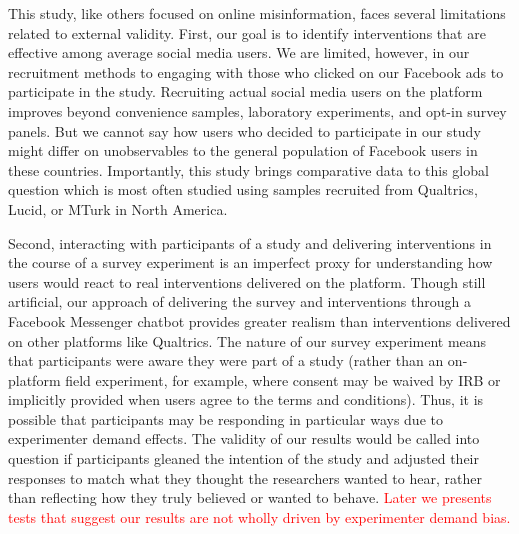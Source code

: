\documentclass[letterpaper, 12pt, parskip=full,DIV=10]{scrartcl}
\begin{document}


This study, like others focused on online misinformation, faces several limitations related to external validity. First, our goal is to identify interventions that are effective among average social media users. We are limited, however, in our recruitment methods to engaging with those who clicked on our Facebook ads to participate in the study.  Recruiting actual social media users on the platform improves beyond convenience samples, laboratory experiments, and opt-in survey panels.  But we cannot say how users who decided to participate in our study might differ on unobservables to the general population of Facebook users in these countries. Importantly, this study brings comparative data to this global question which is most often studied using samples recruited from Qualtrics, Lucid, or MTurk in North America.  

Second, interacting with participants of a study and delivering interventions in the course of a survey experiment is an imperfect proxy for understanding how users would react to real interventions delivered on the platform.  Though still artificial, our approach of delivering the survey and interventions through a Facebook Messenger chatbot provides greater realism than interventions delivered on other platforms like Qualtrics.  The nature of our survey experiment means that participants were aware they were part of a study (rather than an on-platform field experiment, for example,  where consent may be waived by IRB or implicitly provided when users agree to the terms and conditions). Thus, it is possible that participants may be responding in particular ways due to experimenter demand effects. The validity of our results would be called into question if participants gleaned the intention of the study and adjusted their responses to match what they thought the researchers wanted to hear, rather than reflecting how they truly believed or wanted to behave.  \textcolor{red}{Later we presents tests that suggest our results are not wholly driven by experimenter demand bias.} 
\end{document}
